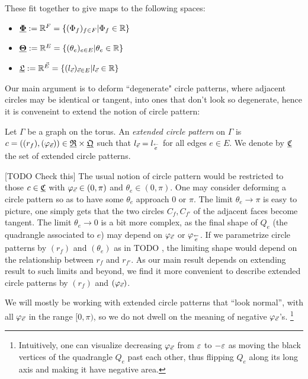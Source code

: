 These fit together to give maps to the following spaces:

\begin{itemize}
	\item ${\underline{\mathbf{\Phi}}} := \mathbb{R}^F = \{(\Phi_f)_{f\in F} | \Phi_f \in \mathbb{R}\}$
	\item ${\underline{\mathbf{\Theta}}} := \mathbb{R}^E = \{(\theta_e)_{e \in E} | \theta_e \in \mathbb{R}\}$
	\item ${\underline{\mathfrak{L}}} := \mathbb{R}^{\vec{E}} = \{(l_{\vec{e}})_{\vec{e} \in E} | l_{\vec{e}} \in \mathbb{R}\}$
\end{itemize}


Our main argument is to deform ``degenerate" circle patterns,
where adjacent circles may
be identical or tangent, into ones that don't look so degenerate,
hence it is conveneint to extend the notion of circle pattern:

\begin{definition}
Let $\Gamma$ be a graph on the torus.
An \emph{extended circle pattern} on $\Gamma$ is
$c = ((r_f), (\varphi_{\vec{e}})) \in {\underline{\mathfrak{R}}} \times {\underline{\mathfrak{Q}}}$
such that $l_{\vec{e}} = l_{\overset{\leftarrow}{e}}$ for all edges $e\in E$. We denote by
${\underline{\mathfrak{C}}}$ the set of extended circle patterns.
\end{definition}




[TODO Check this] The usual notion of circle pattern would be restricted to those $c\in {\underline{\mathfrak{C}}}$
with $\varphi_{\vec{e}} \in (0,\pi)$ and $\theta_e \in (0,\pi)$.
One may consider deforming a circle pattern so as to have some $\theta_e$ approach 0 or $\pi$.
The limit $\theta_e \to \pi$ is easy to picture, one simply gets that the two circles
$C_f, C_{f'}$ of the adjacent faces become tangent. The limit $\theta_e \to 0$
is a bit more complex, as the final shape of $Q_e$ (the quadrangle associated to $e$)
may depend on $\varphi_{\vec{e}}$ or $\varphi_{\overset{\leftarrow}{e}}$.
If we parametrize circle patterns by $(r_f)$ and $(\theta_e)$ as in TODO ,
the limiting shape would depend on the relationship between 
$r_f$ and $r_{f'}$.
As our main result depends on extending  result
to such limits and beyond,
we find it more convenient to describe extended circle patterns by
$(r_f)$ and $(\varphi_{\vec{e}})$.


We will mostly be working with extended circle patterns that ``look normal'',
with all $\varphi_{\vec{e}}$ in the range $[0,\pi)$,
so we do not dwell on the meaning of negative $\varphi_{\vec{e}}$'s.
\footnote{
Intuitively, one can visualize decreasing $\varphi_{\vec{e}}$
from $\varepsilon$ to $-\varepsilon$
as moving the black vertices of the quadrangle $Q_e$ past each other,
thus flipping $Q_e$ along its long axis
and making it have negative area.
}

